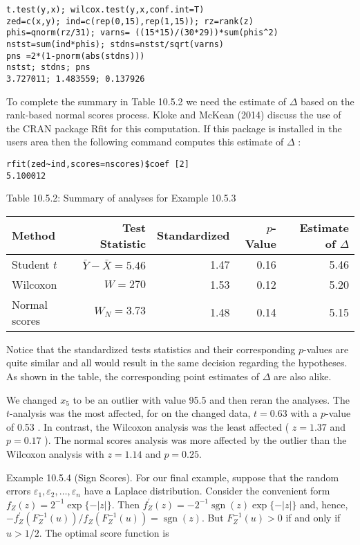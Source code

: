 \begin{verbatim}
t.test(y,x); wilcox.test(y,x,conf.int=T)
zed=c(x,y); ind=c(rep(0,15),rep(1,15)); rz=rank(z)
phis=qnorm(rz/31); varns= ((15*15)/(30*29))*sum(phis^2)
nstst=sum(ind*phis); stdns=nstst/sqrt(varns)
pns =2*(1-pnorm(abs(stdns)))
nstst; stdns; pns
3.727011; 1.483559; 0.137926
\end{verbatim}

To complete the summary in Table 10.5.2 we need the estimate of $\Delta$ based on the rank-based normal scores process. Kloke and McKean (2014) discuss the use of the CRAN package Rfit for this computation. If this package is installed in the users area then the following command computes this estimate of $\Delta$ :

\begin{verbatim}
rfit(zed~ind,scores=nscores)$coef [2]
5.100012
\end{verbatim}

Table 10.5.2: Summary of analyses for Example 10.5.3

\begin{center}
\begin{tabular}{|l|r|r|r|r|}
\hline
Method & Test Statistic & Standardized & $p$-Value & Estimate of $\Delta$ \\
\hline
Student $t$ & $\bar{Y}-\bar{X}=5.46$ & 1.47 & 0.16 & 5.46 \\
Wilcoxon & $W=270$ & 1.53 & 0.12 & 5.20 \\
Normal scores & $W_{N}=3.73$ & 1.48 & 0.14 & 5.15 \\
\hline
\end{tabular}
\end{center}

Notice that the standardized tests statistics and their corresponding $p$-values are quite similar and all would result in the same decision regarding the hypotheses. As shown in the table, the corresponding point estimates of $\Delta$ are also alike.

We changed $x_{5}$ to be an outlier with value 95.5 and then reran the analyses. The $t$-analysis was the most affected, for on the changed data, $t=0.63$ with a $p$-value of 0.53 . In contrast, the Wilcoxon analysis was the least affected ( $z=1.37$ and $p=0.17$ ). The normal scores analysis was more affected by the outlier than the Wilcoxon analysis with $z=1.14$ and $p=0.25$.

Example 10.5.4 (Sign Scores). For our final example, suppose that the random errors $\varepsilon_{1}, \varepsilon_{2}, \ldots, \varepsilon_{n}$ have a Laplace distribution. Consider the convenient form $f_{Z}(z)=2^{-1} \exp \{-|z|\}$. Then $f_{Z}^{\prime}(z)=-2^{-1} \operatorname{sgn}(z) \exp \{-|z|\}$ and, hence, $-f_{Z}^{\prime}\left(F_{Z}^{-1}(u)\right) / f_{Z}\left(F_{Z}^{-1}(u)\right)=\operatorname{sgn}(z)$. But $F_{Z}^{-1}(u)>0$ if and only if $u>1 / 2$. The optimal score function is


